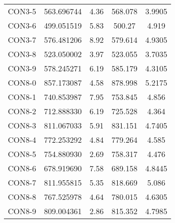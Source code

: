 \begin{table}[ht]
\begin{tabular}{c c c c c}
CON3-5 & 563.696744 & 4.36 & 568.078 & 3.9905 \\
CON3-6 & 499.051519 & 5.83 & 500.27 & 4.919 \\
CON3-7 & 576.481206 & 8.92 & 579.614 & 4.9305 \\
CON3-8 & 523.050002 & 3.97 & 523.055 & 3.7035 \\
CON3-9 & 578.245271 & 6.19 & 585.179 & 4.3105 \\
CON8-0 & 857.173087 & 4.58 & 878.998 & 5.2175 \\
CON8-1 & 740.853987 & 7.95 & 753.845 & 4.856 \\
CON8-2 & 712.888330 & 6.19 & 725.528 & 4.364 \\
CON8-3 & 811.067033 & 5.91 & 831.151 & 4.7405 \\
CON8-4 & 772.253292 & 4.84 & 779.264 & 4.585 \\
CON8-5 & 754.880930 & 2.69 & 758.317 & 4.476 \\
CON8-6 & 678.919690 & 7.58 & 689.158 & 4.8445 \\
CON8-7 & 811.955815 & 5.35 & 818.669 & 5.086 \\
CON8-8 & 767.525978 & 4.64 & 780.015 & 4.6305 \\
CON8-9 & 809.004361 & 2.86 & 815.352 & 4.7985 \\
[1ex]\hline
\end{tabular}
\label{table:nonlin}
\end{table} \clearpage
